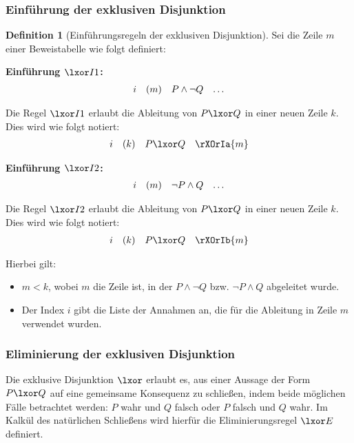 \documentclass{book}
\theoremstyle{plain}
\theoremstyle{remark}
\theoremstyle{definition}
\newtheorem{definition}{Definition}[section]
\begin{document}
\subsubsection{Einführung der exklusiven Disjunktion}
\label{rule:XOrI1}\label{rule:XOrI2}


\begin{definition}[Einführungsregeln der exklusiven Disjunktion]
Sei die Zeile \(m\) einer Beweistabelle wie folgt definiert:

\textbf{Einführung \(\lxor I1\):}
\[
\begin{array}{l l l l}
    i & (m) & P \land \neg Q & \dots \\
\end{array}
\]

Die Regel \(\lxor I1\) erlaubt die Ableitung von \(P \lxor Q\) in einer neuen Zeile \(k\). Dies wird wie folgt notiert:
\[
\begin{array}{l l l l}
    i & (k) & P \lxor Q & \rXOrIa{m} \\
\end{array}
\]

\textbf{Einführung \(\lxor I2\):}
\[
\begin{array}{l l l l}
    i & (m) & \neg P \land Q & \dots \\
\end{array}
\]

Die Regel \(\lxor I2\) erlaubt die Ableitung von \(P \lxor Q\) in einer neuen Zeile \(k\). Dies wird wie folgt notiert:
\[
\begin{array}{l l l l}
    i & (k) & P \lxor Q & \rXOrIb{m} \\
\end{array}
\]

Hierbei gilt:
\begin{itemize}
    \item \(m < k\), wobei \(m\) die Zeile ist, in der \(P \land \neg Q\) bzw. \(\neg P \land Q\) abgeleitet wurde.
    \item Der Index \(i\) gibt die Liste der Annahmen an, die für die Ableitung in Zeile \(m\) verwendet wurden.
\end{itemize}

\end{definition}

\subsubsection{Eliminierung der exklusiven Disjunktion}
\label{rule:XOrE} 
Die exklusive Disjunktion \(\lxor\) erlaubt es, aus einer Aussage der Form \(P \lxor Q\) auf eine gemeinsame Konsequenz zu schließen, indem beide möglichen Fälle betrachtet werden: \(P\) wahr und \(Q\) falsch oder \(P\) falsch und \(Q\) wahr. Im Kalkül des natürlichen Schließens wird hierfür die Eliminierungsregel \(\lxor E\) definiert.
\end{document}
